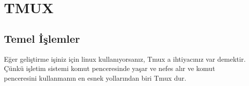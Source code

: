 
%

\chapter{TMUX}

\section{Temel İşlemler}

Eğer geliştirme işiniz için linux kullanıyorsanız, Tmux a ihtiyacınız var demektir. Çünkü işletim sistemi komut penceresinde yaşar ve nefes alır ve komut penceresini kullanmanın en esnek yollarından biri Tmux dur.

%
